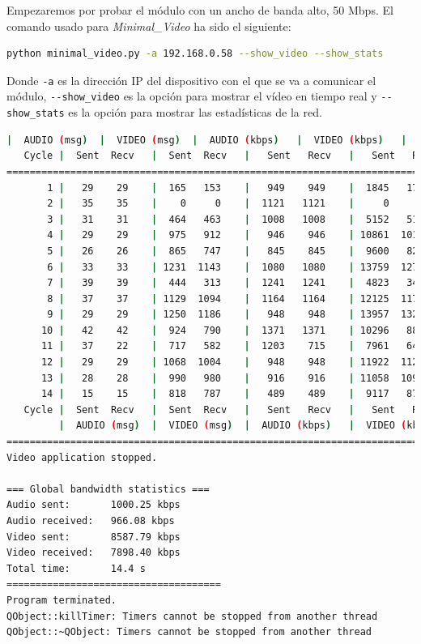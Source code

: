 Empezaremos por probar el módulo con un ancho de banda alto, 50 Mbps. El comando usado para \textit{Minimal\_Video} ha sido el siguiente:

\begin{lstlisting}[language=bash]
python minimal_video.py -a 192.168.0.58 --show_video --show_stats
\end{lstlisting}
Donde \verb|-a| es la dirección IP del dispositivo con el que se va a comunicar el módulo, \verb|--show_video| es la opción para mostrar el vídeo en tiempo real y \verb|--show_stats| es la opción para mostrar las estadísticas de la red.
\vspace{\baselineskip}

\begin{lstlisting}[language=bash,basicstyle=\ttfamily\tiny]
         |  AUDIO (msg)  |  VIDEO (msg)  |  AUDIO (kbps)   |  VIDEO (kbps)   |     CPU (%) 
   Cycle |  Sent  Recv   |  Sent  Recv   |   Sent   Recv   |   Sent   Recv   | Program System
================================================================================================
       1 |   29    29    |  165   153    |   949    949    |  1845   1713    |  16      0       
       2 |   35    35    |    0     0    |  1121   1121    |     0      0    |  45     78       
       3 |   31    31    |  464   463    |  1008   1008    |  5152   5137    |  40     71       
       4 |   29    29    |  975   912    |   946    946    | 10861  10161    |  23     76       
       5 |   26    26    |  865   747    |   845    845    |  9600   8291    |  36     66       
       6 |   33    33    | 1231  1143    |  1080   1080    | 13759  12772    |  48     74       
       7 |   39    39    |  444   313    |  1241   1241    |  4823   3402    |  49     72       
       8 |   37    37    | 1129  1094    |  1164   1164    | 12125  11749    |  41     75       
       9 |   29    29    | 1250  1186    |   948    948    | 13957  13240    |  31     78       
      10 |   42    42    |  924   790    |  1371   1371    | 10296   8803    |  36     67       
      11 |   37    22    |  717   582    |  1203    715    |  7961   6462    |  43     71       
      12 |   29    29    | 1068  1004    |   948    948    | 11922  11209    |  31     69       
      13 |   28    28    |  990   980    |   916    916    | 11058  10948    |  33     73       
      14 |   15    15    |  818   787    |   489    489    |  9117   8769    |  23     72       
   Cycle |  Sent  Recv   |  Sent  Recv   |   Sent   Recv   |   Sent   Recv   | Program System
         |  AUDIO (msg)  |  VIDEO (msg)  |  AUDIO (kbps)   |  VIDEO (kbps)   |     CPU (%) 
===========================================================================================
Video application stopped.

=== Global bandwidth statistics ===
Audio sent:       1000.25 kbps
Audio received:   966.08 kbps
Video sent:       8587.79 kbps
Video received:   7898.40 kbps
Total time:       14.4 s
=====================================
Program terminated.
QObject::killTimer: Timers cannot be stopped from another thread
QObject::~QObject: Timers cannot be stopped from another thread
\end{lstlisting}
\vspace{\baselineskip}

